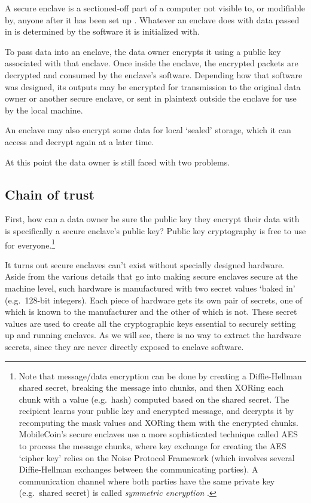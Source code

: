 A secure enclave is a sectioned-off part of a computer not visible to, or modifiable by, anyone after it has been set up \cite{kudelski-sgx-secure-enclaves-review}. Whatever an enclave does with data passed in is determined by the software it is initialized with.

To pass data into an enclave, the data owner encrypts it using a public key associated with that enclave. Once inside the enclave, the encrypted packets are decrypted and consumed by the enclave's software. Depending how that software was designed, its outputs may be encrypted for transmission to the original data owner or another secure enclave, or sent in plaintext outside the enclave for use by the local machine.

An enclave may also encrypt some data for local `sealed' storage, which it can access and decrypt again at a later time.

At this point the data owner is still faced with two problems. 


\subsection{Chain of trust}
\label{subsec:simple-enclaves-chain-of-trust}

First, how can a data owner be sure the public key they encrypt their data with is specifically a secure enclave's public key? Public key cryptography is free to use for everyone.\footnote{Note that message/data encryption can be done by creating a Diffie-Hellman shared secret, breaking the message into chunks, and then XORing each chunk with a value (e.g.\ hash) computed based on the shared secret. The recipient learns your public key and encrypted message, and decrypts it by recomputing the mask values and XORing them with the encrypted chunks. MobileCoin's secure enclaves use a more sophisticated technique called AES \cite{AES-encryption} to process the message chunks, where key exchange for creating the AES `cipher key' relies on the Noise Protocol Framework \cite{noise-protocol-framework} (which involves several Diffie-Hellman exchanges between the communicating parties). A communication channel where both parties have the same private key (e.g.\ shared secret) is called {\em symmetric encryption} \cite{intel-sgx-explained-advanced}.}

It turns out secure enclaves can't exist without specially designed hardware. Aside from the various details that go into making secure enclaves secure at the machine level, such hardware is manufactured with two secret values `baked in' (e.g.\ 128-bit integers). Each piece of hardware gets its own pair of secrets, one of which is known to the manufacturer and the other of which is not. These secret values are used to create all the cryptographic keys essential to securely setting up and running enclaves. As we will see, there is no way to extract the hardware secrets, since they are never directly exposed to enclave software. \cite{intel-sgx-explained-advanced}


